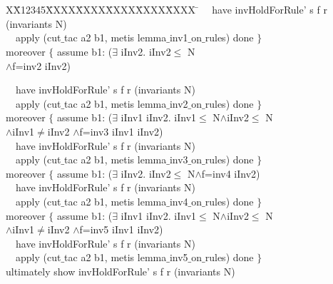 \documentclass[final]{IEEEtran}
\newlength{\fminilength}
\newenvironment{fmini}[1][\linewidth]
  {\setlength{\fminilength}{#1\fboxsep-2\fboxrule}%
   \vspace{2ex}\noindent\begin{lrbox}{\fminibox}\begin{minipage}{\fminilength}%
   \mbox{ }\hfill\vspace{-2.5ex}}%
  {\end{minipage}\end{lrbox}\vspace{1ex}\hspace{0ex}%
   \framebox{\usebox{\fminibox}}}
\newenvironment{specification}
{\noindent\scriptsize
\tt\begin{fmini}\begin{tabbing}X\=X12345\=XXXX\=XXXX\=XXXX\=XXXX\=XXXX
\=\+\kill} {\end{tabbing}\normalfont\end{fmini}}
\def \twoSpaces {\ \ }
\def \iInv {iInv}
\begin{document}
{\begin{specification}
\twoSpaces       have
invHoldForRule' s f r (invariants N)\\

\twoSpaces      apply (cut$\_$tac a2 b1, metis lemma$\_$inv1$\_$on$\_$rules) done
    $\}$\\


    moreover $\{$ assume b1:
($\exists$ \iInv2. \iInv2$\le$ N\\
$\wedge$f=inv2  \iInv2)

\twoSpaces       have invHoldForRule' s f r (invariants N)\\

\twoSpaces      apply (cut$\_$tac a2 b1, metis lemma$\_$inv2$\_$on$\_$rules) done
    $\}$\\


    moreover $\{$      assume b1:
($\exists$ \iInv1 \iInv2. \iInv1$\le$
N$\wedge$\iInv2$\le$ N\\
$\wedge$\iInv1$\neq$\iInv2
$\wedge$f=inv3  \iInv1 \iInv2)\\

\twoSpaces       have
invHoldForRule' s f r (invariants N)\\

\twoSpaces      apply (cut$\_$tac a2 b1, metis lemma$\_$inv3$\_$on$\_$rules) done
    $\}$\\


    moreover $\{$      assume b1:
($\exists$ \iInv2. \iInv2$\le$
N$\wedge$f=inv4  \iInv2)\\

\twoSpaces       have
invHoldForRule' s f r (invariants N)\\

\twoSpaces      apply (cut$\_$tac a2 b1, metis lemma$\_$inv4$\_$on$\_$rules) done
    $\}$\\


    moreover $\{$
      assume b1:
($\exists$ \iInv1 \iInv2. \iInv1$\le$
N$\wedge$\iInv2$\le$ N\\
$\wedge$\iInv1$\neq$\iInv2
$\wedge$f=inv5  \iInv1 \iInv2)\\

\twoSpaces       have
invHoldForRule' s f r (invariants N)\\

\twoSpaces      apply (cut$\_$tac a2 b1, metis lemma$\_$inv5$\_$on$\_$rules) done
    $\}$\\


  ultimately show
invHoldForRule' s f r (invariants N)\\


\end{specification}}
\end{document}
